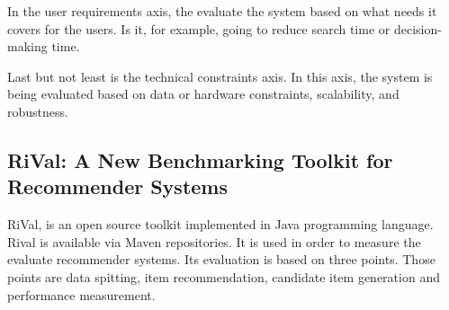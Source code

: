 In the user requirements axis, the evaluate the system based on what needs it covers for the users. Is it, for example, going to reduce search time or decision-making time.

Last but not least is the technical constraints axis. In this axis, the system is being evaluated based on data or hardware constraints, scalability, and robustness.

\subsection{RiVal: A New Benchmarking Toolkit for Recommender Systems \cite{said2014rival}}
RiVal, is an open source toolkit implemented in Java programming language. Rival is available via Maven repositories. It is used in order to measure the evaluate recommender systems. Its evaluation is based on three points. Those points are data spitting, item recommendation, candidate item generation and performance measurement. 
